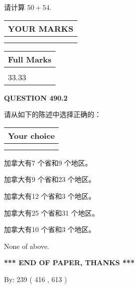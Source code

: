 \documentclass{ctexart}
\begin{document}
  
 
请计算 $ %
50 +  %
54 $.
 

 

 
  
\vspace{0.2in}
  
\noindent\begin{tabular}{|l|}
\hline
 YOUR MARKS  \\
\hline
 \\ 
 \\ 
\hline
\end{tabular}
\hspace{0.05in} \begin{tabular}{|l|}
\hline
 Full Marks  \\
\hline
 \\ 
33.33 \\
\hline
\end{tabular}
{\textbf{\Large{QUESTION
490.2 
}}}
  
  
请从如下的陈述中选择正确的：
  
  
\noindent\hspace{3.0in} \begin{tabular}{|l|}
\hline
Your choice \\
\hline
 \\ 
 \\ 
\hline
\end{tabular}
  
  
 
 
加拿大有7 个省和9 个地区。
 
 
加拿大有9 个省和23 个地区。
 
 
加拿大有12 个省和3 个地区。
 
 
加拿大有25 个省和31 个地区。
 
 
加拿大有10 个省和3 个地区。
 
 
 None of above.
 
 
   
   
 \vspace{0.2in}
 
   
   
   
   
\vspace{1.0in} 
{\textbf{\large{ *** END OF PAPER, THANKS *** }}} 
   
   
\hspace{1.0in} By: 
 239 ( 416 ,  613 )
   
\end{document}
